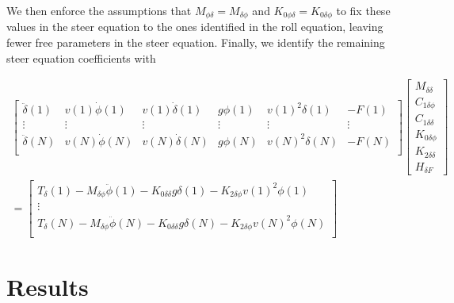 \documentclass[a4paper]{article}
\begin{document}
We then enforce the assumptions that $M_{\phi\delta} = M_{\delta\phi}$ and
$K_{0\phi\delta} = K_{0\delta\phi}$ to fix these values in the steer equation
to the ones identified in the roll equation, leaving fewer free parameters in
the steer equation. Finally, we identify the remaining steer equation
coefficients with

\begin{align}
  \begin{bmatrix}
    \ddot{\delta}(1) &
    v(1) \dot{\phi}(1) &
    v(1) \dot{\delta}(1) &
    g \phi(1) &
    v(1)^2 \delta(1) &
    - F(1)\\
    \vdots & \vdots & \vdots & \vdots & \vdots & \vdots \\
    \ddot{\delta}(N) &
    v(N) \dot{\phi}(N) &
    v(N) \dot{\delta}(N) &
    g \phi(N) &
    v(N)^2 \delta(N) &
    - F(N)\\
  \end{bmatrix}
  \begin{bmatrix}
    M_{\delta\delta} \\
    C_{1\delta\phi} \\
    C_{1\delta\delta} \\
    K_{0\delta\phi} \\
    K_{2\delta\delta} \\
    H_{\delta F}
  \end{bmatrix} \nonumber \\
  =
  \begin{bmatrix}
    T_\delta(1)
    - M_{\delta\phi} \ddot{\phi}(1)
    - K_{0\delta\delta} g \delta(1)
    - K_{2\delta\phi} v(1)^2 \phi(1) \\
    \vdots\\
    T_\delta(N)
    - M_{\delta\phi} \ddot{\phi}(N)
    - K_{0\delta\delta} g \delta(N)
    - K_{2\delta\phi} v(N)^2 \phi(N) \\
  \end{bmatrix}
\end{align}

\section{Results}
\end{document}
